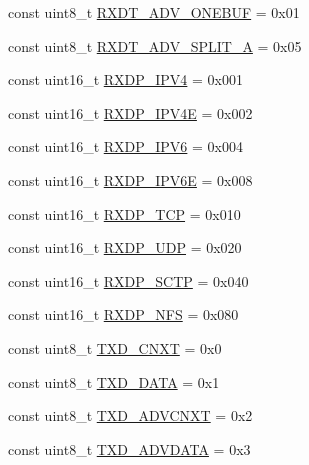 \begin{DoxyCompactItemize}
\item 
const uint8\_\-t \hyperlink{namespaceiGbReg_ad3aad4627ec1e57dbc49e8ddf0e8c10b}{RXDT\_\-ADV\_\-ONEBUF} = 0x01
\item 
const uint8\_\-t \hyperlink{namespaceiGbReg_a86ad221aa778dcbb0f9c59fbdd29b652}{RXDT\_\-ADV\_\-SPLIT\_\-A} = 0x05
\item 
const uint16\_\-t \hyperlink{namespaceiGbReg_a38d1a85169979c3aa9b416e264fc61cc}{RXDP\_\-IPV4} = 0x001
\item 
const uint16\_\-t \hyperlink{namespaceiGbReg_a42c5ab6a6309d0493c5507c429f072a2}{RXDP\_\-IPV4E} = 0x002
\item 
const uint16\_\-t \hyperlink{namespaceiGbReg_acc96df3ea896c51031535f11e0beac6a}{RXDP\_\-IPV6} = 0x004
\item 
const uint16\_\-t \hyperlink{namespaceiGbReg_af42fc69035a6c21ed4d4e41df83981a2}{RXDP\_\-IPV6E} = 0x008
\item 
const uint16\_\-t \hyperlink{namespaceiGbReg_a3194c61cd3bbfba3e0c2002e3bc370f5}{RXDP\_\-TCP} = 0x010
\item 
const uint16\_\-t \hyperlink{namespaceiGbReg_a8bb50a93437adde2602f7501247099d0}{RXDP\_\-UDP} = 0x020
\item 
const uint16\_\-t \hyperlink{namespaceiGbReg_a28e7a3b67c3706e10dbd04b178b8524c}{RXDP\_\-SCTP} = 0x040
\item 
const uint16\_\-t \hyperlink{namespaceiGbReg_a3c747907eaeaa934bead4cda74971708}{RXDP\_\-NFS} = 0x080
\item 
const uint8\_\-t \hyperlink{namespaceiGbReg_1_1TxdOp_a134b13753f53fae4712f0cf445beb0fe}{TXD\_\-CNXT} = 0x0
\item 
const uint8\_\-t \hyperlink{namespaceiGbReg_1_1TxdOp_a489d6c941b18bbb3bd7e7cd54c9774f6}{TXD\_\-DATA} = 0x1
\item 
const uint8\_\-t \hyperlink{namespaceiGbReg_1_1TxdOp_a715b843e900b8ccb187c30b76c8643b7}{TXD\_\-ADVCNXT} = 0x2
\item 
const uint8\_\-t \hyperlink{namespaceiGbReg_1_1TxdOp_a97280b2931b22cb8a343e91ee6d0fd80}{TXD\_\-ADVDATA} = 0x3
\end{DoxyCompactItemize}


